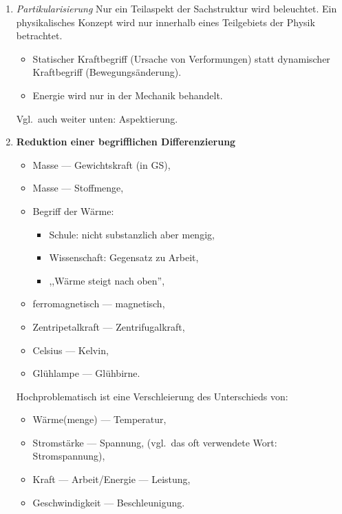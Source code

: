 \begin{enumerate}
	\item { \it Partikularisierung }
	Nur ein Teilaspekt der Sachstruktur wird beleuchtet.
	Ein physikalisches Konzept wird nur innerhalb eines Teilgebiets der
	Physik betrachtet.
	
	\mip
	\begin{beisp2}
	\begin{itemize}
		\item Statischer Kraftbegriff (Ursache von Verformungen) statt dynamischer
	Kraftbegriff (Bewegungs\"{a}nderung).
		\item Energie wird nur in der Mechanik behandelt.
	\end{itemize}	
	\end{beisp2}

	
	Vgl.\ auch weiter unten: Aspektierung.
	
	\item \textbf{Reduktion einer begrifflichen Differenzierung}
	
	\mip
	\begin{beisp2}
	\begin{itemize}
		\item Masse --- Gewichtskraft (in GS),
		\item Masse --- Stoffmenge,
		\item Begriff der W\"{a}rme:
		\begin{itemize}
			\item Schule: nicht substanzlich aber mengig,
			\item Wissenschaft: Gegensatz zu Arbeit,
			\item ,,W\"{a}rme steigt nach oben'',
		\end{itemize}
		\item ferromagnetisch --- magnetisch,
		\item Zentripetalkraft --- Zentrifugalkraft,
		\item Celsius --- Kelvin,
		\item Gl\"{u}hlampe --- Gl\"{u}hbirne.
	\end{itemize}
	\end{beisp2}
	
	Hochproblematisch ist eine Verschleierung des Unterschieds von:
	\begin{itemize}
		\item W\"{a}rme(menge) --- Temperatur,
		\item Stromst\"{a}rke --- Spannung,
		(vgl.\ das oft verwendete Wort: Stromspannung),
		\item Kraft --- Arbeit/Energie --- Leistung,
		\item Geschwindigkeit --- Beschleunigung.
	\end{itemize}
	

\end{enumerate}
